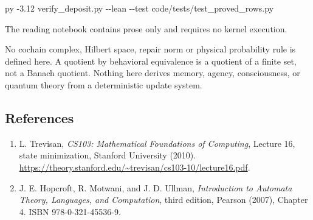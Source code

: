\documentclass[
  11pt,
]{article}
\newenvironment{Shaded}{}{}
\newcommand{\AttributeTok}[1]{\textcolor[rgb]{0.49,0.56,0.16}{#1}}
\newcommand{\ExtensionTok}[1]{#1}
\newcommand{\NormalTok}[1]{#1}
\providecommand{\tightlist}{%
  \setlength{\itemsep}{0pt}\setlength{\parskip}{0pt}}
\begin{document}
\begin{Shaded}
\begin{Highlighting}[]
\ExtensionTok{py} \AttributeTok{{-}3.12}\NormalTok{ verify\_deposit.py }\AttributeTok{{-}{-}lean} \AttributeTok{{-}{-}test}\NormalTok{ code/tests/test\_proved\_rows.py}
\end{Highlighting}
\end{Shaded}

The reading notebook contains prose only and requires no kernel
execution.

No cochain complex, Hilbert space, repair norm or physical probability
rule is defined here. A quotient by behavioral equivalence is a quotient
of a finite set, not a Banach quotient. Nothing here derives memory,
agency, consciousness, or quantum theory from a deterministic update
system.

\subsection{References}\label{references}

\begin{enumerate}
\def\labelenumi{\arabic{enumi}.}
\tightlist
\item
  L. Trevisan, \emph{CS103: Mathematical Foundations of Computing},
  Lecture 16, state minimization, Stanford University (2010).
  \url{https://theory.stanford.edu/~trevisan/cs103-10/lecture16.pdf}.
\item
  J. E. Hopcroft, R. Motwani, and J. D. Ullman, \emph{Introduction to
  Automata Theory, Languages, and Computation}, third edition, Pearson
  (2007), Chapter 4. ISBN 978-0-321-45536-9.
\end{enumerate}
\end{document}
